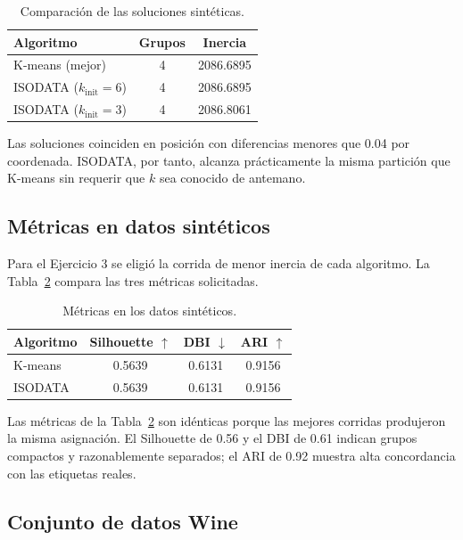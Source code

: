 \documentclass[10pt,twocolumn]{article}
\begin{document}
\begin{table}[H]
\centering
\caption{Comparación de las soluciones sintéticas.}
\label{tab:comparacion-sintetica}
\small
\begin{tabular}{lcc}
\toprule
Algoritmo & Grupos & Inercia\\
\midrule
K-means (mejor) & 4 & 2086.6895\\
ISODATA ($k_{\mathrm{init}}=6$) & 4 & 2086.6895\\
ISODATA ($k_{\mathrm{init}}=3$) & 4 & 2086.8061\\
\bottomrule
\end{tabular}
\end{table}

Las soluciones coinciden en posición con diferencias menores que 0.04 por
coordenada. ISODATA, por tanto, alcanza prácticamente la misma partición que
K-means sin requerir que $k$ sea conocido de antemano.

\subsection{Métricas en datos sintéticos}

Para el Ejercicio 3 se eligió la corrida de menor inercia de cada algoritmo.
La Tabla~\ref{tab:metricas-sinteticas} compara las tres métricas solicitadas.

\begin{table}[H]
\centering
\caption{Métricas en los datos sintéticos.}
\label{tab:metricas-sinteticas}
\small
\begin{tabular}{lccc}
\toprule
Algoritmo & Silhouette $\uparrow$ & DBI $\downarrow$ & ARI $\uparrow$\\
\midrule
K-means & 0.5639 & 0.6131 & 0.9156\\
ISODATA & 0.5639 & 0.6131 & 0.9156\\
\bottomrule
\end{tabular}
\end{table}

Las métricas de la Tabla~\ref{tab:metricas-sinteticas} son idénticas porque
las mejores corridas produjeron la misma asignación. El Silhouette de 0.56 y
el DBI de 0.61 indican grupos compactos y razonablemente separados; el ARI de
0.92 muestra alta concordancia con las etiquetas reales.

\subsection{Conjunto de datos Wine}
\end{document}
